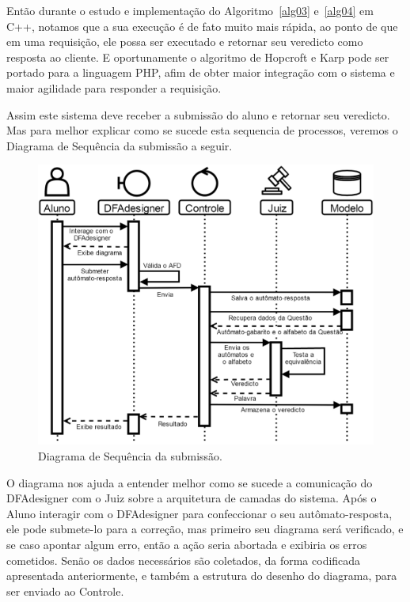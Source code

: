 \documentclass[
	12pt,				%
	openany,
	oneside,
	a4paper,			%
	english,			%
	brazil				%
	]{abntex2}
\begin{document}
  Então durante o estudo e implementação do Algoritmo~\ref{alg03} e~\ref{alg04} em C++, notamos que a sua execução é de fato muito mais rápida, ao ponto de que em uma requisição, ele possa ser executado e retornar seu veredicto como resposta ao cliente. E oportunamente o algoritmo de Hopcroft e Karp pode ser portado para a linguagem PHP, afim de obter maior integração com o sistema e maior agilidade para responder a requisição.
  
  Assim este sistema deve receber a submissão do aluno e retornar seu veredicto. Mas para melhor explicar como se sucede esta sequencia de processos, veremos o Diagrama de Sequência da submissão a seguir.
  
\begin{figure}[H]
  \centering
  \includegraphics[scale=0.31]{diagSequencia.png}%
  \caption{Diagrama de Sequência da submissão.}
  \label{fig:diagSequencia}
  \vspace{-0.5cm}
\end{figure}
  
  O diagrama nos ajuda a entender melhor como se sucede a comunicação do DFAdesigner com o Juiz sobre a arquitetura de camadas do sistema. Após o Aluno interagir com o DFAdesigner para confeccionar o seu autômato-resposta, ele pode submete-lo para a correção, mas primeiro seu diagrama será verificado, e se caso apontar algum erro, então a ação seria abortada e exibiria os erros cometidos. Senão os dados necessários são coletados, da forma codificada apresentada anteriormente, e também a estrutura do desenho do diagrama, para ser enviado ao Controle. 
  
\end{document}
